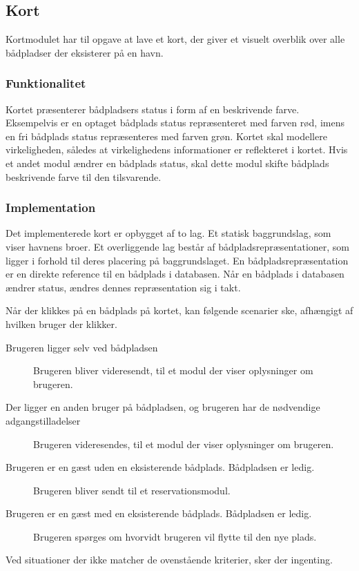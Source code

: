 \subsection{Kort}
\label{sub:kort}

Kortmodulet har til opgave at lave et kort, der giver et visuelt overblik over alle bådpladser der eksisterer på en havn.

\subsubsection{Funktionalitet}
\label{ssub:kort_funktionalitet}

Kortet præsenterer bådpladsers status i form af en beskrivende farve. Eksempelvis er en optaget bådplads status repræsenteret med farven rød, imens en fri bådplads status repræsenteres med farven grøn. Kortet skal modellere virkeligheden, således at virkelighedens informationer er reflekteret i kortet. Hvis et andet modul ændrer en bådplads status, skal dette modul skifte bådplads beskrivende farve til den tilsvarende. 


\subsubsection{Implementation}
\label{ssub:kort_implementation}

Det implementerede kort er opbygget af to lag. Et statisk baggrundslag, som viser havnens broer. Et overliggende lag består af bådpladsrepræsentationer, som ligger i forhold til deres placering på baggrundslaget. En bådpladsrepræsentation er en direkte reference til en bådplads i databasen. Når en bådplads i databasen ændrer status, ændres dennes repræsentation sig i takt.


Når der klikkes på en bådplads på kortet, kan følgende scenarier ske, afhængigt af hvilken bruger der klikker.

\begin{description}
  \item[Brugeren ligger selv ved bådpladsen] Brugeren bliver videresendt, til et modul der viser oplysninger om brugeren.
  \item[Der ligger en anden bruger på bådpladsen, og brugeren har de nødvendige adgangstilladelser] Brugeren videresendes, til et modul der viser oplysninger om brugeren.
  \item[Brugeren er en gæst uden en eksisterende bådplads. Bådpladsen er ledig.] Brugeren bliver sendt til et reservationsmodul.
  \item[Brugeren er en gæst med en eksisterende bådplads. Bådpladsen er ledig.] Brugeren spørges om hvorvidt brugeren vil flytte til den nye plads.
\end{description}

Ved situationer der ikke matcher de ovenstående kriterier, sker der ingenting.


